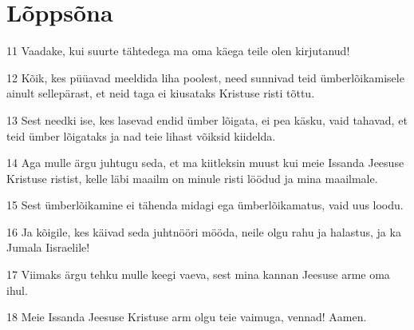 \section*{Lõppsõna}

\par 11 Vaadake, kui suurte tähtedega ma oma käega teile olen kirjutanud!
\par 12 Kõik, kes püüavad meeldida liha poolest, need sunnivad teid ümberlõikamisele ainult sellepärast, et neid taga ei kiusataks Kristuse risti tõttu.
\par 13 Sest needki ise, kes lasevad endid ümber lõigata, ei pea käsku, vaid tahavad, et teid ümber lõigataks ja nad teie lihast võiksid kiidelda.
\par 14 Aga mulle ärgu juhtugu seda, et ma kiitleksin muust kui meie Issanda Jeesuse Kristuse ristist, kelle läbi maailm on minule risti löödud ja mina maailmale.
\par 15 Sest ümberlõikamine ei tähenda midagi ega ümberlõikamatus, vaid uus loodu.
\par 16 Ja kõigile, kes käivad seda juhtnööri mööda, neile olgu rahu ja halastus, ja ka Jumala Iisraelile!
\par 17 Viimaks ärgu tehku mulle keegi vaeva, sest mina kannan Jeesuse arme oma ihul.
\par 18 Meie Issanda Jeesuse Kristuse arm olgu teie vaimuga, vennad! Aamen.




